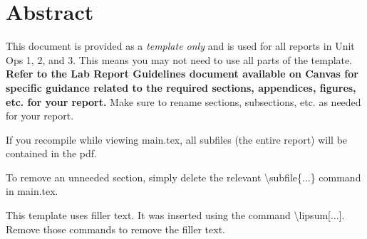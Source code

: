 \section*{Abstract}

This document is provided as a \textit{template only} and is used for all reports in Unit Ops 1, 2, and 3. This means you may not need to use all parts of the template. \textbf{Refer to the Lab Report Guidelines document available on Canvas for specific guidance related to the required sections, appendices, figures, etc. for your report.} Make sure to rename sections, subsections, etc. as needed for your report.

If you recompile while viewing main.tex, all subfiles (the entire report) will be contained in the pdf.

To remove an unneeded section, simply delete the relevant \textbackslash subfile\{...\} command in main.tex.

This template uses filler text. It was inserted using the command \textbackslash lipsum[...]. Remove those commands to remove the filler text.

\clearpage